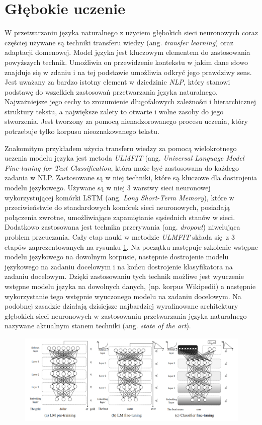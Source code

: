 \section{Głębokie uczenie}

W przetwarzaniu języka naturalnego z użyciem głębokich sieci neuronowych coraz częściej używane są techniki transferu wiedzy (ang. \textit{transfer learning}) oraz adaptacji domenowej. Model języka jest kluczowym elementem do zastosowania powyższych technik. Umożliwia on przewidzenie kontekstu w jakim dane słowo znajduje się w zdaniu i na tej podstawie umożliwia odkryć jego prawdziwy sens. Jest uważany za bardzo istotny element w dziedzinie \textit{NLP}, który stanowi podstawę do wszelkich zastosowań przetwarzania języka naturalnego. Najważniejsze jego cechy to zrozumienie długofalowych zależności i hierarchicznej struktury tekstu, a największe zalety to otwarte i wolne zasoby do jego stworzenia. Jest tworzony za pomocą nienadzorowanego procesu uczenia, który potrzebuje tylko korpusu nieoznakowanego tekstu.

Znakomitym przykładem użycia transferu wiedzy za pomocą wielokrotnego uczenia modelu języka jest metoda \textit{ULMFIT} \cite{howard2018universal} (ang. \textit{Universal Language Model Fine-tuning for Text Classification}, która może być zastosowana do każdego zadania w NLP. Zastosowane są w niej techniki, które są kluczowe dla dostrojenia modelu językowego. Używane są w niej 3 warstwy sieci neuronowej wykorzystującej komórki LSTM (ang. \textit{Long Short-Term Memory}), które w przeciwieństwie do standardowych komórek sieci neuronowych, posiadają połączenia zwrotne, umożliwiające zapamiętanie sąsiednich stanów w sieci. Dodatkowo zastosowana jest technika przerywania (ang. \textit{dropout}) niwelująca problem przeuczania. Cały etap nauki w metodzie \textit{ULMFIT} składa się z 3 etapów zaprezentowanych na rysunku \ref{rys:ulmfit}. Na początku następuje szkolenie wstępne modelu językowego na dowolnym korpusie, następnie dostrojenie modelu językowego na zadaniu docelowym i na końcu dostrojenie klasyfikatora na zadaniu docelowym. Dzięki zastosowaniu tych technik możliwe jest wyuczenie wstępne modelu języka na dowolnych danych, (np. korpus Wikipedii) a następnie wykorzystanie tego wstępnie wyuczonego modelu na zadaniu docelowym. Na podobnej zasadzie działają dzisiejsze najbardziej wyrafinowane architektury głębokich sieci neuronowych w zastosowaniu przetwarzania języka naturalnego nazywane aktualnym stanem techniki (ang. \textit{state of the art}).

\begin{figure}[t]
\centering\includegraphics[width=\textwidth]{figures/ulmfit.png}
\label{rys:ulmfit}
\end{figure}